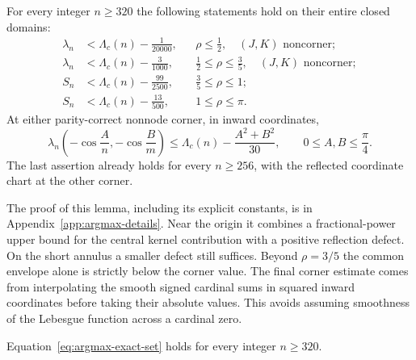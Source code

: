 \begin{lemma}
\label{lem:argmax-four-regions}
For every integer $n\geq320$ the following statements hold on their
entire closed domains:
\begin{align}
 \lambda_n&<\Lambda_c(n)-\frac1{20000},
 &&\rho\leq\tfrac12,\quad (J,K)\text{ noncorner};
                                                        \label{eq:argmax-half-near}\\
 \lambda_n&<\Lambda_c(n)-\frac3{1000},
 &&\tfrac12\leq\rho\leq\tfrac35,\quad (J,K)\text{ noncorner};
                                                        \label{eq:argmax-annulus}\\
 S_n&<\Lambda_c(n)-\frac{99}{2500},
 &&\tfrac35\leq\rho\leq1;
                                                        \label{eq:argmax-wide}\\
 S_n&<\Lambda_c(n)-\frac{13}{500},
 &&1\leq\rho\leq\pi.                               \label{eq:argmax-outer}
\end{align}
At either parity-correct nonnode corner, in inward coordinates,
\begin{equation}
 \lambda_n\left(-\cos\frac A n,-\cos\frac Bm\right)
 \leq\Lambda_c(n)-\frac{A^2+B^2}{30},
 \qquad 0\leq A,B\leq\frac\pi4.                    \label{eq:argmax-corner-loss}
\end{equation}
The last assertion already holds for every $n\geq256$, with the reflected
coordinate chart at the other corner.
\end{lemma}

The proof of this lemma, including its explicit constants, is in
Appendix~\ref{app:argmax-details}.  Near the origin it combines a
fractional-power upper bound for the central kernel contribution with
a positive reflection defect.  On the short annulus a smaller defect
still suffices.  Beyond $\rho=3/5$ the common envelope alone is strictly
below the corner value.  The final corner estimate comes from
interpolating the smooth signed cardinal sums in squared inward
coordinates before taking their absolute values.  This avoids assuming
smoothness of the Lebesgue function across a cardinal zero.

\begin{theorem}
\label{thm:argmax-analytic-tail}
Equation~\eqref{eq:argmax-exact-set} holds for every integer $n\geq320$.
\end{theorem}

